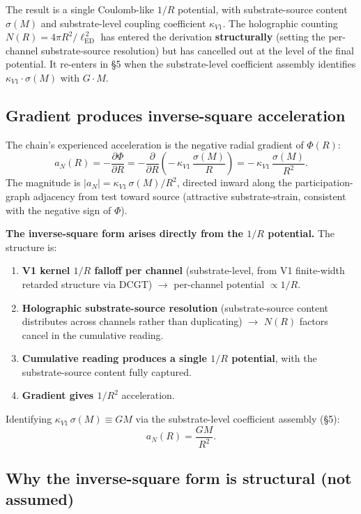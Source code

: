 \documentclass[11pt,a4paper]{article}
\begin{document}
The result is a single Coulomb-like $1/R$ potential, with substrate-source content $\sigma(M)$ and substrate-level coupling coefficient $\kappa_{V1}$. The holographic counting $N(R) = 4\pi R^2/\ell_\mathrm{ED}^{\,2}$ has entered the derivation \textbf{structurally} (setting the per-channel substrate-source resolution) but has cancelled out at the level of the final potential. It re-enters in \S5 when the substrate-level coefficient assembly identifies $\kappa_{V1} \cdot \sigma(M)$ with $G \cdot M$.

\subsection{Gradient produces inverse-square acceleration}

The chain's experienced acceleration is the negative radial gradient of $\Phi(R)$:
\[
a_N(R) = -\frac{\partial \Phi}{\partial R} = -\frac{\partial}{\partial R}\!\left(-\,\kappa_{V1}\,\frac{\sigma(M)}{R}\right) = -\,\kappa_{V1}\,\frac{\sigma(M)}{R^2}.
\]
The magnitude is $|a_N| = \kappa_{V1}\,\sigma(M)/R^2$, directed inward along the participation-graph adjacency from test toward source (attractive substrate-strain, consistent with the negative sign of $\Phi$).

\textbf{The inverse-square form arises directly from the $1/R$ potential.} The structure is:

\begin{enumerate}[noitemsep]
\item \textbf{V1 kernel $1/R$ falloff per channel} (substrate-level, from V1 finite-width retarded structure via DCGT) $\to$ per-channel potential $\propto 1/R$.
\item \textbf{Holographic substrate-source resolution} (substrate-source content distributes across channels rather than duplicating) $\to$ $N(R)$ factors cancel in the cumulative reading.
\item \textbf{Cumulative reading produces a single $1/R$ potential}, with the substrate-source content fully captured.
\item \textbf{Gradient gives $1/R^2$} acceleration.
\end{enumerate}

Identifying $\kappa_{V1}\,\sigma(M) \equiv GM$ via the substrate-level coefficient assembly (\S5):
\[
a_N(R) = \frac{GM}{R^2}.
\]

\subsection{Why the inverse-square form is structural (not assumed)}
\end{document}
